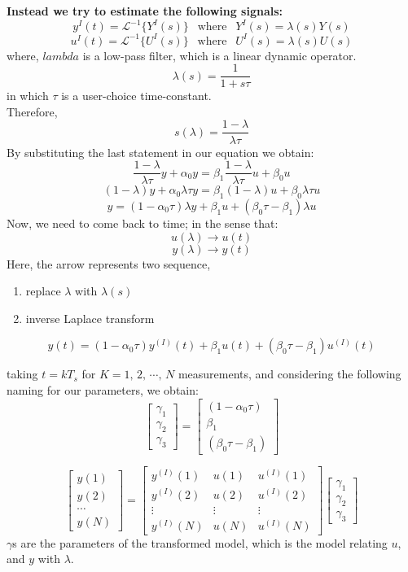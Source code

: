 \begin{enumerate}
\textbf{Instead we try to estimate the following signals:}
\[
y^{I}(t) = \mathcal{L}^{-1}\{Y^{I}(s)\} \:\:\text{ where }\:\: Y^{I}(s) = \lambda(s) Y(s)
\]
\[
u^{I}(t) = \mathcal{L}^{-1}\{U^{I}(s)\} \:\:\text{ where }\:\: U^{I}(s) = \lambda(s) U(s)
\]
where, $lambda$ is a low-pass filter, which is a linear dynamic operator.
\[
\lambda(s) = \frac{1}{1 + s\tau}
\]
in which $\tau$ is a user-choice time-constant.\\

Therefore,
\[
s(\lambda) = \frac{1 - \lambda}{\lambda\tau}
\]
By substituting the last statement in our equation we obtain:
\[
\frac{1-\lambda}{\lambda\tau}y + \alpha_0y = \beta_1\frac{1 - \lambda}{\lambda\tau} u +\beta_0 u
\]
\[
(1-\lambda)y + \alpha_0\lambda\tau y = \beta_1(1 - \lambda) u +\beta_0\lambda\tau u
\]
\[
y = (1-\alpha_0 \tau)\lambda y + \beta_1 u + (\beta_0 \tau - \beta_1) \lambda u
\]
Now, we need to come back to time; in the sense that:
\[
u(\lambda) \rightarrow u(t)
\]
\[
y(\lambda) \rightarrow y(t)
\]
Here, the arrow represents two sequence, 
\begin{enumerate}
    \item replace $\lambda$ with $\lambda(s)$
    \item inverse Laplace transform
\end{enumerate}

\[
y(t) = (1-\alpha_0 \tau)y^{(I)}(t) + \beta_1 u(t) + (\beta_0 \tau - \beta_1) u^{(I)}(t)
\]

taking \(t = kT_s\) for \(K = 1,\,2,\,\cdots,\,N\) measurements, and considering the following naming for our parameters, we obtain:
\[
\begin{bmatrix}
\gamma_1 \\
\gamma_2 \\
\gamma_3
\end{bmatrix}
=
\begin{bmatrix}
(1 - \alpha_0 \tau) \\
\beta_1 \\
(\beta_0 \tau - \beta_1)
\end{bmatrix}
\]

\[
\begin{bmatrix}
y(1) \\
y(2) \\
\cdots \\
y(N)
\end{bmatrix}
= \begin{bmatrix}
y^{(I)}(1) & u(1) & u^{(I)}(1) \\
y^{(I)}(2) & u(2) & u^{(I)}(2) \\
\vdots & \vdots & \vdots \\
y^{(I)}(N) & u(N) & u^{(I)}(N)
\end{bmatrix}
\begin{bmatrix}
\gamma_1 \\
\gamma_2 \\
\gamma_3
\end{bmatrix}
\]
$\gamma$s are the parameters of the transformed model, which is the model relating $u$, and $y$ with $\lambda$. \\


\end{enumerate}

